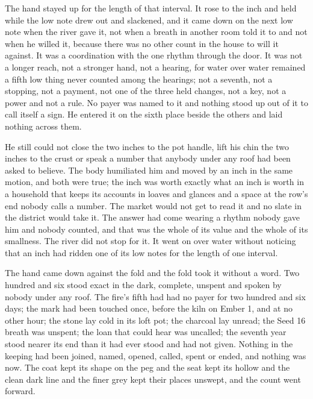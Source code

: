 The hand stayed up for the length of that interval. It rose to the inch and held while the low note drew out and slackened, and it came down on the next low note when the river gave it, not when a breath in another room told it to and not when he willed it, because there was no other count in the house to will it against. It was a coordination with the one rhythm through the door. It was not a longer reach, not a stronger hand, not a hearing, for water over water remained a fifth low thing never counted among the hearings; not a seventh, not a stopping, not a payment, not one of the three held changes, not a key, not a power and not a rule. No payer was named to it and nothing stood up out of it to call itself a sign. He entered it on the sixth place beside the others and laid nothing across them.

He still could not close the two inches to the pot handle, lift his chin the two inches to the crust or speak a number that anybody under any roof had been asked to believe. The body humiliated him and moved by an inch in the same motion, and both were true; the inch was worth exactly what an inch is worth in a household that keeps its accounts in loaves and glances and a space at the row's end nobody calls a number. The market would not get to read it and no slate in the district would take it. The answer had come wearing a rhythm nobody gave him and nobody counted, and that was the whole of its value and the whole of its smallness. The river did not stop for it. It went on over water without noticing that an inch had ridden one of its low notes for the length of one interval.

The hand came down against the fold and the fold took it without a word. Two hundred and six stood exact in the dark, complete, unspent and spoken by nobody under any roof. The fire's fifth had had no payer for two hundred and six days; the mark had been touched once, before the kiln on Ember 1, and at no other hour; the stone lay cold in its loft pot; the charcoal lay unread; the Seed 16 breath was unspent; the loan that could hear was uncalled; the seventh year stood nearer its end than it had ever stood and had not given. Nothing in the keeping had been joined, named, opened, called, spent or ended, and nothing was now. The coat kept its shape on the peg and the seat kept its hollow and the clean dark line and the finer grey kept their places unswept, and the count went forward.
